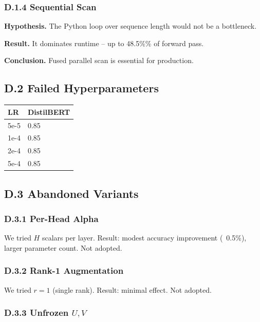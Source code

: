 \subsubsection{D.1.4 Sequential Scan}

\textbf{Hypothesis.} The Python loop over sequence length would not be a 
bottleneck.

\textbf{Result.} It dominates runtime -- up to 48.5\%\% of forward pass.

\textbf{Conclusion.} Fused parallel scan is essential for production.

\subsection{D.2 Failed Hyperparameters}

\begin{table}[H]
\centering
\small
\begin{tabular}{ll}
\toprule
\textbf{LR} & \textbf{DistilBERT} \\
\midrule
5e-5 & 0.85 \\
1e-4 & 0.85 \\
2e-4 & 0.85 \\
5e-4 & 0.85 \\
\bottomrule
\end{tabular}
\end{table}

\subsection{D.3 Abandoned Variants}

\subsubsection{D.3.1 Per-Head Alpha}

We tried $H$ scalars per layer. Result: modest accuracy improvement (~0.5\%), 
larger parameter count. Not adopted.

\subsubsection{D.3.2 Rank-1 Augmentation}

We tried $r = 1$ (single rank). Result: minimal effect. Not adopted.

\subsubsection{D.3.3 Unfrozen $U, V$}

